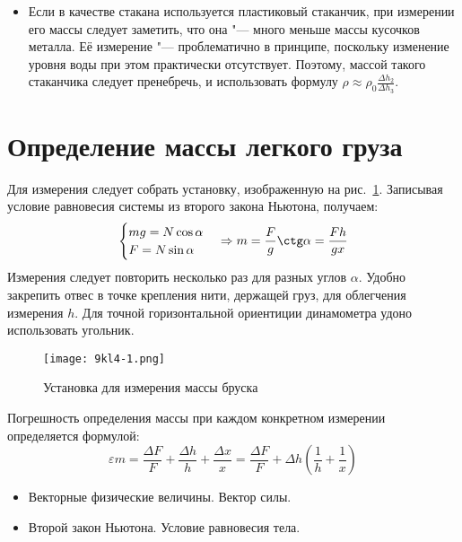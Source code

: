 \AdditionalNotes
\begin{itemize}
  \item Если в качестве стакана используется пластиковый стаканчик, при измерении его массы следует заметить, что она "--- много меньше массы кусочков металла. Её измерение "--- проблематично в принципе, поскольку изменение уровня воды при этом практически отсутствует. Поэтому, массой такого стаканчика следует пренебречь, и использовать формулу \(\rho \approx \rho_0 \frac{\Delta h_2}{\Delta h_3}\).
\end{itemize}
\section{Определение массы легкого груза}
\SolveVariant
Для измерения следует собрать установку, изображенную на рис.~\ref{fig:9kl4:inst}. Записывая условие равновесия системы из второго закона Ньютона, получаем:
\begin{equation*}
    \begin{cases}
    mg=N\cos\alpha\\
    F=N\sin\alpha
    \end{cases}
    \Rightarrow m=\frac{F}{g} \ctg \alpha = \frac{F h}{g x}
\end{equation*}
Измерения следует повторить несколько раз для разных углов \(\alpha\). Удобно закрепить отвес в точке крепления нити, держащей груз, для облегчения измерения \(h\). Для точной горизонтальной ориентиции динамометра удоно использовать угольник.
\begin{figure}[h]
    \centering
    \texttt{[image: 9kl4-1.png]}
    \caption{Установка для измерения массы бруска}
    \label{fig:9kl4:inst}
 \end{figure}
\MesErrors
Погрешность определения массы при каждом конкретном измерении определяется формулой:
\begin{equation}
    \varepsilon m = \frac{\Delta F}{F} + \frac{\Delta h}{h} + \frac{\Delta x}{x}= \frac{\Delta F}{F}+\Delta h \left(\frac{1}{h} + \frac{1}{x}\right)
    \label{eq:9kl4:err}
\end{equation}
\SchoolBase
\begin{itemize}
    \item Векторные физические величины. Вектор силы.
    \item Второй закон Ньютона. Условие равновесия тела.
\end{itemize}
